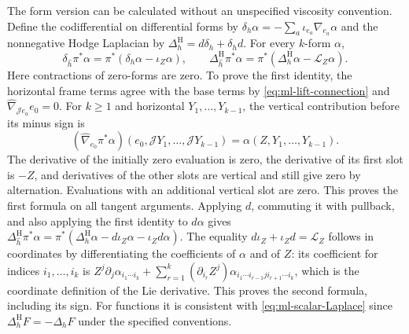 The form version can be calculated without an unspecified viscosity
convention. Define the codifferential on differential forms by
$\delta_h\alpha=-\sum_a\iota_{e_a}\nabla_{e_a}\alpha$ and the
nonnegative Hodge Laplacian by
$\Delta_h^{\mathrm H}=d\delta_h+\delta_hd$.
For every $k$-form $\alpha$,
\begin{equation}\label{eq:ml-codiff}
 \delta_{\widehat h}\pi^*\alpha
       =\pi^*(\delta_h\alpha-\iota_Z\alpha),\qquad
 \Delta_{\widehat h}^{\mathrm H}\pi^*\alpha
       =\pi^*(\Delta_h^{\mathrm H}\alpha-\mathcal L_Z\alpha).
\end{equation}
Here contractions of zero-forms are zero. To prove the first identity,
the horizontal frame terms agree with the base terms by
\eqref{eq:ml-lift-connection} and
$\widehat\nabla_{\mathcal Je_a}e_0=0$. For $k\geq1$ and horizontal
$Y_1,\ldots,Y_{k-1}$, the vertical contribution before its minus sign is
\[
 (\widehat\nabla_{e_0}\pi^*\alpha)
       (e_0,\mathcal JY_1,\ldots,\mathcal JY_{k-1})
 =\alpha(Z,Y_1,\ldots,Y_{k-1}).
\]
The derivative of the initially zero evaluation is zero, the derivative
of its first slot is $-Z$, and derivatives of the other slots are
vertical and still give zero by alternation. Evaluations with an
additional vertical slot are zero. This proves the first formula on
all tangent arguments. Applying $d$, commuting it with pullback, and
also applying the first identity to $d\alpha$ gives
$\Delta^{\mathrm H}_{\widehat h}\pi^*\alpha
=\pi^*(\Delta_h^{\mathrm H}\alpha-d\iota_Z\alpha-\iota_Zd\alpha)$.
The equality $d\iota_Z+\iota_Zd=\mathcal L_Z$ follows in coordinates
by differentiating the coefficients of $\alpha$ and of $Z$: its
coefficient for indices $i_1,\ldots,i_k$ is
$Z^j\partial_j\alpha_{i_1\cdots i_k}
+\sum_{r=1}^k(\partial_{i_r}Z^j)
  \alpha_{i_1\cdots i_{r-1}j i_{r+1}\cdots i_k}$,
which is the coordinate definition of the Lie derivative. This proves
the second formula, including its sign. For functions it is consistent
with \eqref{eq:ml-scalar-Laplace} since
$\Delta_h^{\mathrm H}F=-\Delta_hF$ under the specified conventions.


